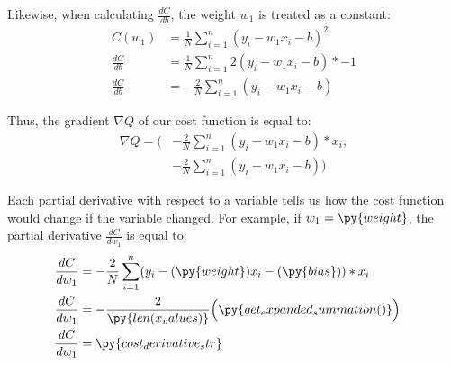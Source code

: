 \documentclass[12pt, demo]{article}
\begin{document}
Likewise, when calculating $\frac{dC}{db}$, the weight $w_1$ is treated as a constant:
\begin{align*}
	C(w_1)        & = \frac{1}{N} \sum_{i=1}^{n} (y_i - w_1x_i - b)^2
	\\
	\frac{dC}{db} & = \frac{1}{N} \sum_{i=1}^{n} 2(y_i - w_1x_i - b) * -1
	\\
	\frac{dC}{db} & = -\frac{2}{N} \sum_{i=1}^{n} (y_i - w_1x_i - b)
\end{align*}

Thus, the gradient $\nabla Q$ of our cost function is equal to:
\begin{align*}
	\nabla Q = \Big(
	 &
	-\frac{2}{N} \sum_{i=1}^{n} (y_i - w_1x_i - b) * x_i,
	\\
	 & -\frac{2}{N} \sum_{i=1}^{n} (y_i - w_1x_i - b)
	\Big)
\end{align*}



Each partial derivative with respect to a variable tells us how the cost function would change if the variable changed. For example, if $w_1 = \py{weight}$, the partial derivative $\frac{dC}{dw_1}$ is equal to:
\begin{align*}
	\frac{dC}{dw_1} & = -\frac{2}{N} \sum_{i=1}^{n} (y_i - (\py{weight})x_i - (\py{bias})) * x_i
	\\
	\frac{dC}{dw_1} & =
	\begin{aligned}[t]
		-\frac{2}{\py{len(x_values)}}
		\Big( & \py{get_expanded_summation()}\Big)
	\end{aligned}
	\\
	\frac{dC}{dw_1} & = \py{cost_derivative_str}
\end{align*}
\end{document}
